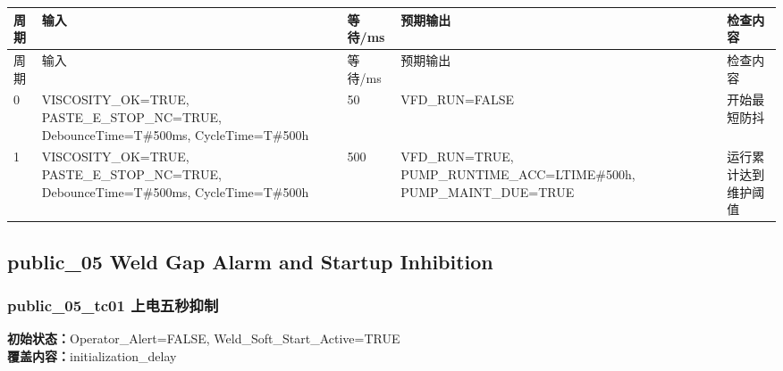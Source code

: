 \begin{longtable}{L{1.0cm}L{4.7cm}L{1.4cm}L{4.0cm}L{2.1cm}}

\toprule

周期 & 输入 & 等待/ms & 预期输出 & 检查内容\\

\midrule

\endfirsthead

\toprule

周期 & 输入 & 等待/ms & 预期输出 & 检查内容\\

\midrule

\endhead

0 & VISCOSITY\_OK=TRUE, PASTE\_E\_STOP\_NC=TRUE, DebounceTime=T\#500ms, CycleTime=T\#500h & 50 & VFD\_RUN=FALSE & 开始最短防抖\\

1 & VISCOSITY\_OK=TRUE, PASTE\_E\_STOP\_NC=TRUE, DebounceTime=T\#500ms, CycleTime=T\#500h & 500 & VFD\_RUN=TRUE, PUMP\_RUNTIME\_ACC=LTIME\#500h, PUMP\_MAINT\_DUE=TRUE & 运行累计达到维护阈值\\

\bottomrule

\end{longtable}

\subsection{{\ttfamily public\_05} Weld Gap Alarm and Startup Inhibition}

\subsubsection{{\ttfamily public\_05\_tc01} 上电五秒抑制}

\noindent\textbf{初始状态：}Operator\_Alert=FALSE, Weld\_Soft\_Start\_Active=TRUE\\

\textbf{覆盖内容：}initialization\_delay

